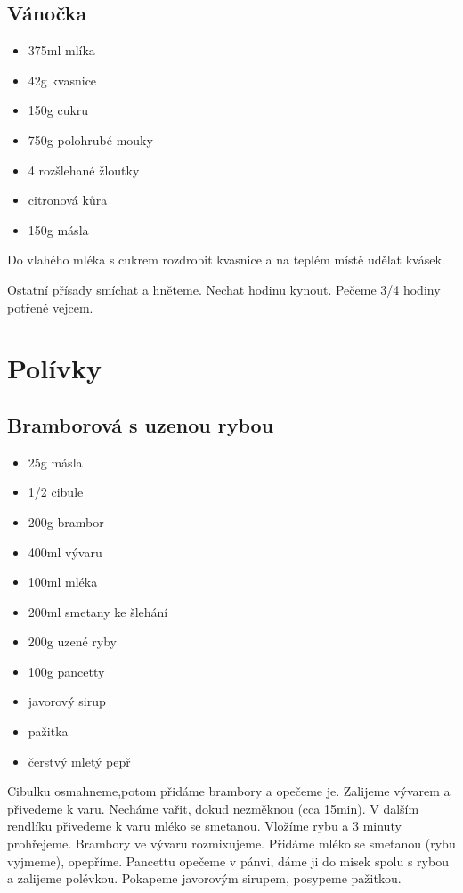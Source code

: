 \documentclass[10pt,a4paper]{article}
\newenvironment{myitemize}
{ \begin{itemize}
    \setlength{\itemsep}{0pt}
    \setlength{\parskip}{0pt}
    \setlength{\parsep}{0pt}     }
{ \end{itemize}                  }
\begin{document}
\subsection{Vánočka}
\begin{minipage}[t]{0,5\textwidth}
\begin{myitemize} 
\item 375ml mlíka
\item 42g kvasnice
\item 150g cukru
\item 750g polohrubé mouky
\item 4 rozšlehané žloutky
\item citronová kůra
\item 150g másla
\end{myitemize}
\end{minipage}
\begin{minipage}[t]{0,5\textwidth}
Do vlahého mléka s cukrem rozdrobit kvasnice a na teplém místě udělat kvásek.

Ostatní přísady smíchat a hněteme. Nechat hodinu kynout. Pečeme 3/4 hodiny potřené vejcem.
\end{minipage}
\pagebreak
\section{Polívky}
\subsection{Bramborová s uzenou rybou}
\begin{minipage}[t]{0,5\textwidth}
\begin{myitemize} 
\item 25g másla
\item 1/2 cibule
\item 200g brambor
\item 400ml vývaru
\item 100ml mléka
\item 200ml smetany ke šlehání
\item 200g uzené ryby
\item 100g pancetty
\item javorový sirup
\item pažitka
\item čerstvý mletý pepř
\end{myitemize}
\end{minipage}
\begin{minipage}[t]{0,5\textwidth}
Cibulku osmahneme,potom přidáme brambory a opečeme je. Zalijeme vývarem a přivedeme k varu. Necháme vařit, dokud nezměknou (cca 15min). V dalším rendlíku přivedeme k varu mléko se smetanou. Vložíme rybu a 3 minuty prohřejeme. Brambory ve vývaru rozmixujeme. Přidáme mléko se smetanou (rybu vyjmeme), opepříme. Pancettu opečeme v pánvi, dáme ji do misek spolu s rybou a zalijeme polévkou. Pokapeme javorovým sirupem, posypeme pažitkou.
\end{minipage}
\end{document}
